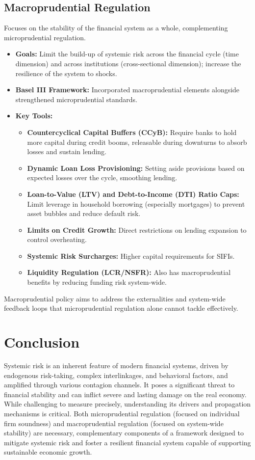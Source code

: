 \subsection{Macroprudential Regulation}
Focuses on the stability of the financial system as a whole, complementing microprudential regulation.
\begin{itemize}
    \item \textbf{Goals:} Limit the build-up of systemic risk across the financial cycle (time dimension) and across institutions (cross-sectional dimension); increase the resilience of the system to shocks.
    \item \textbf{Basel III Framework:} Incorporated macroprudential elements alongside strengthened microprudential standards.
    \item \textbf{Key Tools:}
        \begin{itemize}
            \item \textbf{Countercyclical Capital Buffers (CCyB):} Require banks to hold more capital during credit booms, releasable during downturns to absorb losses and sustain lending.
            \item \textbf{Dynamic Loan Loss Provisioning:} Setting aside provisions based on expected losses over the cycle, smoothing lending.
            \item \textbf{Loan-to-Value (LTV) and Debt-to-Income (DTI) Ratio Caps:} Limit leverage in household borrowing (especially mortgages) to prevent asset bubbles and reduce default risk.
            \item \textbf{Limits on Credit Growth:} Direct restrictions on lending expansion to control overheating.
            \item \textbf{Systemic Risk Surcharges:} Higher capital requirements for SIFIs.
            \item \textbf{Liquidity Regulation (LCR/NSFR):} Also has macroprudential benefits by reducing funding risk system-wide.
        \end{itemize}
\end{itemize}
Macroprudential policy aims to address the externalities and system-wide feedback loops that microprudential regulation alone cannot tackle effectively.

\section{Conclusion}

Systemic risk is an inherent feature of modern financial systems, driven by endogenous risk-taking, complex interlinkages, and behavioral factors, and amplified through various contagion channels. It poses a significant threat to financial stability and can inflict severe and lasting damage on the real economy. While challenging to measure precisely, understanding its drivers and propagation mechanisms is critical. Both microprudential regulation (focused on individual firm soundness) and macroprudential regulation (focused on system-wide stability) are necessary, complementary components of a framework designed to mitigate systemic risk and foster a resilient financial system capable of supporting sustainable economic growth.
